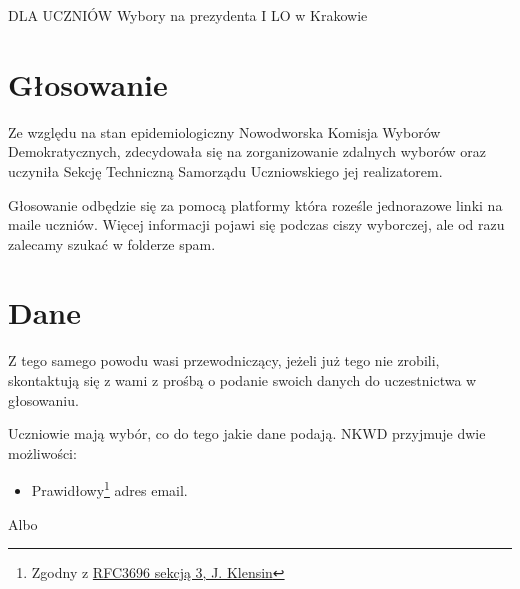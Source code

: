 \pagestyle{fancy}


\unappendix

\begin{center}
  \LARGE{ \textsc{DLA UCZNIÓW}}
  \vspace{0.3cm}
  \hline
  \vspace{1.2cm}
  Wybory na prezydenta I LO w Krakowie
  \vspace{0.8cm}
\end{center}

\section{Głosowanie}
\normalsize
\normalshape

\hspace{0.5cm} Ze względu na stan epidemiologiczny Nowodworska Komisja Wyborów Demokratycznych, zdecydowała się na zorganizowanie zdalnych wyborów oraz uczyniła Sekcję Techniczną Samorządu Uczniowskiego jej realizatorem. \par
Głosowanie odbędzie się za pomocą platformy która roześle jednorazowe linki na maile uczniów. Więcej informacji pojawi się podczas ciszy wyborczej, ale od razu zalecamy szukać w folderze spam.

\section{Dane}

\hspace{0.5cm} Z tego samego powodu wasi przewodniczący, jeżeli już tego nie zrobili, skontaktują się z wami z prośbą o podanie swoich danych do uczestnictwa w głosowaniu.\par
\vspace{0.3cm}
Uczniowie mają wybór, co do tego jakie dane podają. NKWD przyjmuje dwie możliwości:

\begin{itemize}
  \item Prawidłowy\footnote{Zgodny z \href{https://tools.ietf.org/html/rfc3696}{RFC3696 sekcją 3, J. Klensin}} adres email.
\end{itemize}

\vspace{-0.3cm}
\hspace{1cm} Albo
\vspace{-0.3cm}

